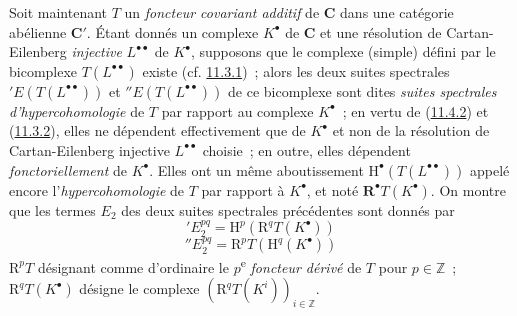 \begin{env}[11.4.3]
\label{0.11.4.3-fr}
Soit maintenant $T$ un \emph{foncteur covariant additif} de $\boldsymbol{C}$
dans une catégorie abélienne $\boldsymbol{C}'$. Étant donnés un complexe
$K^\bullet$ de $\boldsymbol{C}$ et une résolution de Cartan-Eilenberg \emph{injective}
$L^{\bullet\bullet}$ de $K^\bullet$, supposons que le complexe (simple) défini
par le bicomplexe $T(L^{\bullet\bullet})$ existe
(cf. \hyperref[0.11.3.1-fr]{11.3.1})~; alors les deux suites spectrales
$'E(T(L^{\bullet\bullet}))$ et $''E(T(L^{\bullet\bullet}))$ de ce bicomplexe
sont dites \emph{suites spectrales d'hypercohomologie} de $T$ par rapport au
complexe $K^\bullet$~; en vertu de
(\hyperref[0.11.4.2-fr]{11.4.2}) et
(\hyperref[0.11.3.2-fr]{11.3.2}), elles ne dépendent effectivement que de
$K^\bullet$ et non de la résolution de Cartan-Eilenberg injective
$L^{\bullet\bullet}$ choisie~; en outre, elles dépendent
\emph{fonctoriellement} de $K^\bullet$. Elles ont un même aboutissement
$\mathrm H^\bullet(T(L^{\bullet\bullet}))$ appelé encore
l'\emph{hypercohomologie} de $T$ par rapport à $K^\bullet$, et noté
$\mathbf R^\bullet T(K^\bullet)$. On montre que les termes $E_2$ des deux
suites spectrales précédentes sont donnés par
\[
  \label{0.11.4.3.1-fr}
  'E_2^{pq}=\mathrm H^p(\mathrm R^qT(K^\bullet))
  \tag{11.4.3.1}
\]
\[
  \label{0.11.4.3.2-fr}
  ''E_2^{pq}=\mathrm R^pT(\mathrm H^q(K^\bullet))
  \tag{11.4.3.2}
\]
$\mathrm R^pT$ désignant comme d'ordinaire le $p$\textsuperscript{e} \emph{foncteur
dérivé} de $T$ pour $p\in\mathbb Z$~; $\mathrm R^qT(K^\bullet)$ désigne le
complexe $(\mathrm R^qT(K^i))_{i\in\mathbb Z}$.
\end{env}

